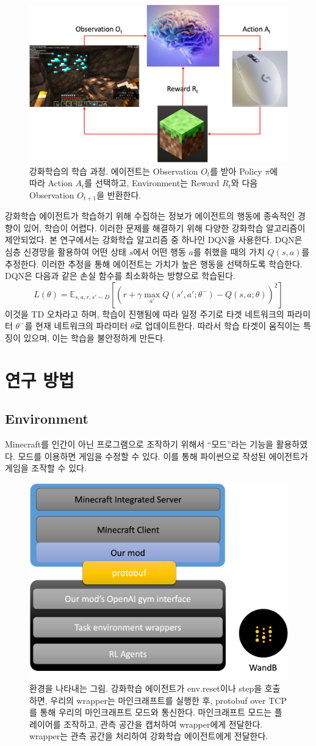 \documentclass{tudelftposter}
\begin{document}
\begin{figure}
  \centering
  \includegraphics[width=.4\textwidth]{reinforcement.png}
  \caption{강화학습의 학습 과정. 에이전트는 Observation $O_t$를 받아 Policy $\pi$에 따라 Action $A_t$를 선택하고, Environment는 Reward $R_t$와 다음 Observation $O_{t+1}$을 반환한다.}
  \label{fig:test}
\end{figure}
강화학습 에이전트가 학습하기 위해 수집하는 정보가 에이전트의 행동에 종속적인 경향이 있어, 학습이 어렵다. 이러한 문제를 해결하기 위해 다양한 강화학습 알고리즘이 제안되었다. 본 연구에서는 강화학습 알고리즘 중 하나인 DQN을 사용한다. DQN은 심층 신경망을 활용하여 어떤 상태 $s$에서 어떤 행동 $a$를 취했을 때의 가치 $Q(s,a)$를 추정한다. 이러한 추정을 통해 에이전트는 가치가 높은 행동을 선택하도록 학습한다. DQN은 다음과 같은 손실 함수를 최소화하는 방향으로 학습된다.
\begin{equation}
  L(\theta) = \mathbb{E}_{s,a,r,s' \sim D}[(r + \gamma \max_{a'}Q(s',a';\theta^-) - Q(s,a;\theta))^2]
\end{equation}
이것을 TD 오차라고 하며, 학습이 진행됨에 따라 일정 주기로 타겟 네트워크의 파라미터 $\theta^-$를 현재 네트워크의 파라미터 $\theta$로 업데이트한다. 따라서 학습 타겟이 움직이는 특징이 있으며, 이는 학습을 불안정하게 만든다.

\section{연구 방법}
\subsection{Environment}
Minecraft를 인간이 아닌 프로그램으로 조작하기 위해서 ``모드''라는 기능을 활용하였다. 모드를 이용하면 게임을 수정할 수 있다. 이를 통해 파이썬으로 작성된 에이전트가 게임을 조작할 수 있다.

\begin{figure}
  \centering
  \includegraphics[width=.3\textwidth]{arch1.png}
  \caption{환경을 나타내는 그림. 강화학습 에이전트가 env.reset이나 step을 호출하면, 우리의 wrapper는 마인크래프트를 실행한 후, protobuf over TCP를 통해 우리의 마인크래프트 모드와 통신한다. 마인크래프트 모드는 플레이어를 조작하고, 관측 공간을 캡처하여 wrapper에게 전달한다. wrapper는 관측 공간을 처리하여 강화학습 에이전트에게 전달한다.}
  \label{fig:test}
\end{figure}
\end{document}
